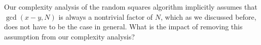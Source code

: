 \begin{exercise}
    Our complexity analysis of the random squares algorithm implicitly 
    assumes that $\gcd(x-y, N)$ is always a nontrivial factor of $N$, 
    which as we discussed before, does not have to be the case in general. 
    What is the impact of removing this assumption from our complexity analysis? 
\end{exercise}